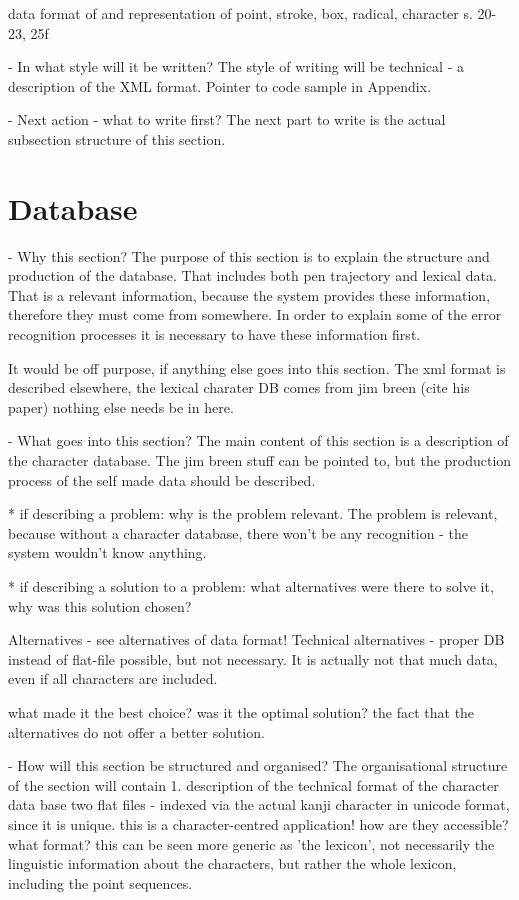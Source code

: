   data format of and representation of 
  point, stroke, box, radical, character s. 20-23, 25f

- In what style will it be written?
  The style of writing will be technical - a description of the XML format.
  Pointer to code sample in Appendix.

- Next action - what to write first?
  The next part to write is the actual subsection structure of this section.

\section{Database}
\label{sec:hwre:database}

- Why this section? 
  The purpose of this section is to explain the structure and production of 
  the database.   That includes both pen trajectory and lexical data.
  That is a relevant information, because the system provides these information,
  therefore they must come from somewhere. In order to explain some of the
  error recognition processes it is necessary to have these information first.

  It would be off purpose, if anything else goes into this section.
  The xml format is described elsewhere, the lexical charater DB comes from 
  jim breen (cite his paper) nothing else needs be in here.

- What goes into this section?
  The main content of this section is a description of the character database.
  The jim breen stuff can be pointed to, but the production process of the 
  self made data should be described.

  * if describing a problem: why is the problem relevant.
    The problem is relevant, because without a character database, there won't
    be any recognition - the system wouldn't know anything.

  * if describing a solution to a problem: what alternatives were
    there to solve it, why was this solution chosen? 

    Alternatives - see alternatives of data format!
    Technical alternatives - proper DB instead of flat-file possible,
    but not necessary. It is actually not that much data,
    even if all characters are included.
   
    what made it the best choice? was it the optimal solution?
    the fact that the alternatives do not offer a better solution.

- How will this section be structured and organised?
  The organisational structure of the section will contain
  1. description of the technical format of the character data base
     two flat files - indexed via the actual kanji character in unicode
     format, since it is unique. this is a character-centred application!
     how are they accessible? what format?
     this can be seen more generic as 'the lexicon', not necessarily
     the linguistic information about the characters, 
     but rather the whole lexicon, including the point sequences.

